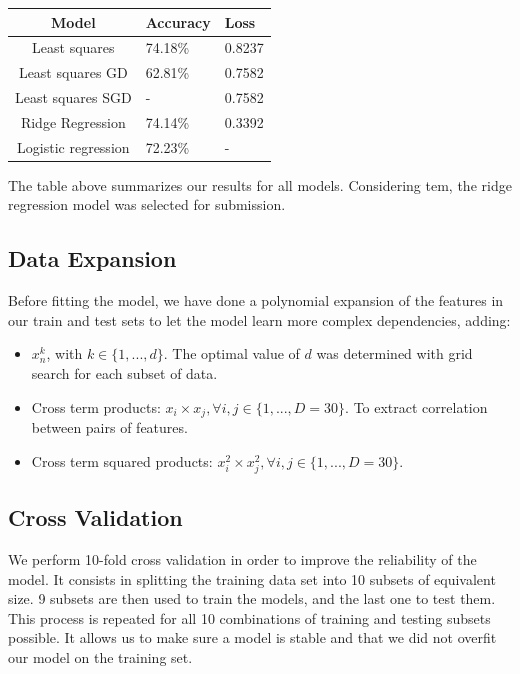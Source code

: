 \documentclass[10pt,conference,compsocconf]{IEEEtran}
\begin{document}
\begin{tabu} to 0.46\textwidth { | c | X[c] | X[c] | }
  \hline
  Model & Accuracy & Loss \\ 
  \hline 
  Least squares & 74.18\% & 0.8237 \\ 
  Least squares GD & 62.81\% & 0.7582 \\ 
  Least squares SGD & - & 0.7582 \\ 
  Ridge Regression & 74.14\% & 0.3392 \\ 
  Logistic regression & 72.23\% & - \\ 
  \hline
\end{tabu}\vspace*{10px}

The table above summarizes our results for all models. Considering tem, the ridge regression model was selected for submission.

\subsection{Data Expansion}

Before fitting the model, we have done a polynomial expansion of the features in our train and test sets to let the model learn more complex dependencies, adding:
\begin{itemize}
  \item $x_n^k$, with $k \in \{1, ..., d\}$. The optimal value of $d$ was determined with grid search for each subset of data.
  \item Cross term products: $x_i \times x_j, \forall i,j \in \{1, ..., D=30\}$. To extract correlation between pairs of features.
  \item Cross term squared products: $x_i^2 \times x_j^2, \forall i,j \in \{1, ..., D=30\}$.
\end{itemize}

\subsection{Cross Validation}

We perform 10-fold cross validation in order to improve the reliability of the model. It consists in splitting the training data set into 10 subsets of equivalent size. 9 subsets are then used to train the models, and the last one to test them. This process is repeated for all 10 combinations of training and testing subsets possible. It allows us to make sure a model is stable and that we did not overfit our model on the training set.
\end{document}
